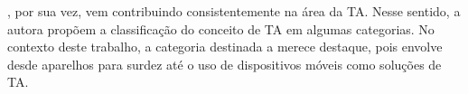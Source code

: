 , por sua vez, vem contribuindo consistentemente na área da TA. Nesse sentido, a autora propõem a classificação do conceito de TA em algumas categorias. No contexto deste trabalho, a categoria destinada a  merece destaque, pois envolve desde aparelhos para surdez até o uso de dispositivos móveis como soluções de TA.%

